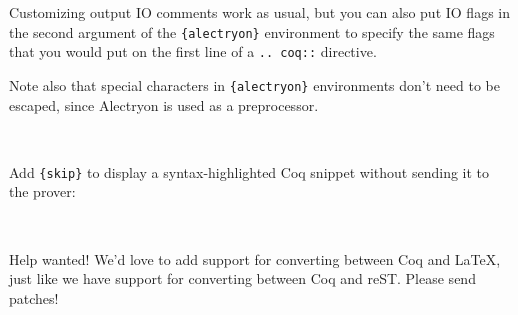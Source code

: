 \documentclass[10pt]{beamer}
\begin{document}
\begin{frame}[fragile]{Customizing output}
  IO comments work as usual, but you can also put IO flags in the second argument of the \verb|{alectryon}| environment to specify the same flags that you would put on the first line of a \verb|.. coq::| directive.

  Note also that special characters in \verb|{alectryon}| environments don't need to be escaped, since Alectryon is used as a preprocessor.



\begin{alectryon}
  \begin{\al{sentence}}
    \begin{\al{output}}
      \begin{\al{messages}}
        \begin{\al{message}}
          ~~~~~~~~
        \end{\al{message}}
      \end{\al{messages}}
    \end{\al{output}}
  \end{\al{sentence}}
\end{alectryon}

  Add \verb|{skip}| to display a syntax-highlighted Coq snippet without sending it to the prover:

\begin{alectryon}
  \begin{\al{txt}}
    ~~~~
  \end{\al{txt}}
\end{alectryon}
\end{frame}

\begin{frame}{Help wanted!}
  We'd love to add support for converting between Coq and LaTeX, just like we have support for converting between Coq and reST.  Please send patches!
\end{frame}
\end{document}
